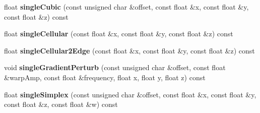\begin{DoxyCompactItemize}
float {\bfseries single\+Cubic} (const unsigned char \&offset, const float \&x, const float \&y, const float \&z) const
\item 
\mbox{\label{classnoisefast_aa3156e5246eb8add058c3d1bfea9e74a}} 
float {\bfseries single\+Cellular} (const float \&x, const float \&y, const float \&z) const
\item 
\mbox{\label{classnoisefast_ad18d57d5398f9cd9833fc6add0ff72fe}} 
float {\bfseries single\+Cellular2\+Edge} (const float \&x, const float \&y, const float \&z) const
\item 
\mbox{\label{classnoisefast_afce68d54c59d6b360a3ee88a0a3c357f}} 
void {\bfseries single\+Gradient\+Perturb} (const unsigned char \&offset, const float \&warp\+Amp, const float \&frequency, float x, float y, float z) const
\item 
\mbox{\label{classnoisefast_add4f12f402d22f16e80ba0bcec97dcc9}} 
float {\bfseries single\+Simplex} (const unsigned char \&offset, const float \&x, const float \&y, const float \&z, const float \&w) const
\end{DoxyCompactItemize}
